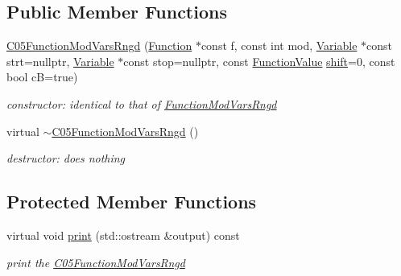 \subsection*{Public Member Functions}
\begin{DoxyCompactItemize}
\item 
\mbox{\label{class_s_m_spp__di__unipi__it_1_1_c05_function_mod_vars_rngd_af604aa7f85735b75b7e6c29c4a0fb0a3}} 
\mbox{\hyperlink{class_s_m_spp__di__unipi__it_1_1_c05_function_mod_vars_rngd_af604aa7f85735b75b7e6c29c4a0fb0a3}{C05\+Function\+Mod\+Vars\+Rngd}} (\mbox{\hyperlink{class_s_m_spp__di__unipi__it_1_1_function}{Function}} $\ast$const f, const int mod, \mbox{\hyperlink{class_s_m_spp__di__unipi__it_1_1_variable}{Variable}} $\ast$const strt=nullptr, \mbox{\hyperlink{class_s_m_spp__di__unipi__it_1_1_variable}{Variable}} $\ast$const stop=nullptr, const \mbox{\hyperlink{class_s_m_spp__di__unipi__it_1_1_function_mod_a44f54e31f9fa8a29194218c234876284}{Function\+Value}} \mbox{\hyperlink{class_s_m_spp__di__unipi__it_1_1_function_mod_a177a0111cf0d0fdc5409df06c3b5e282}{shift}}=0, const bool cB=true)
\begin{DoxyCompactList}\small\item\em constructor\+: identical to that of \mbox{\hyperlink{class_s_m_spp__di__unipi__it_1_1_function_mod_vars_rngd}{Function\+Mod\+Vars\+Rngd}} \end{DoxyCompactList}\item 
\mbox{\label{class_s_m_spp__di__unipi__it_1_1_c05_function_mod_vars_rngd_ae19f046764090030e949b5df286e6bd5}} 
virtual \mbox{\hyperlink{class_s_m_spp__di__unipi__it_1_1_c05_function_mod_vars_rngd_ae19f046764090030e949b5df286e6bd5}{$\sim$\+C05\+Function\+Mod\+Vars\+Rngd}} ()
\begin{DoxyCompactList}\small\item\em destructor\+: does nothing \end{DoxyCompactList}\end{DoxyCompactItemize}
\subsection*{Protected Member Functions}
\begin{DoxyCompactItemize}
\item 
\mbox{\label{class_s_m_spp__di__unipi__it_1_1_c05_function_mod_vars_rngd_a2e7b9c9148a98c5c342e8c25cac95926}} 
virtual void \mbox{\hyperlink{class_s_m_spp__di__unipi__it_1_1_c05_function_mod_vars_rngd_a2e7b9c9148a98c5c342e8c25cac95926}{print}} (std\+::ostream \&output) const
\begin{DoxyCompactList}\small\item\em print the \mbox{\hyperlink{class_s_m_spp__di__unipi__it_1_1_c05_function_mod_vars_rngd}{C05\+Function\+Mod\+Vars\+Rngd}} \end{DoxyCompactList}\end{DoxyCompactItemize}

